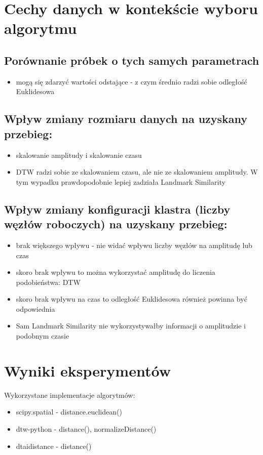 \section{Cechy danych w kontekście wyboru algorytmu}
\subsection{Porównanie próbek o tych samych parametrach}
\begin{itemize}
    \item mogą się zdarzyć wartości odstające - z czym średnio radzi sobie odległość Euklidesowa
\end{itemize}
\subsection{Wpływ zmiany rozmiaru danych na uzyskany przebieg:}\begin{itemize}
    \item skalowanie amplitudy i skalowanie czasu
    \item DTW radzi sobie ze skalowaniem czasu, ale nie ze skalowaniem amplitudy. W tym wypadku prawdopodobnie lepiej zadziała Landmark Similarity
\end{itemize}

\subsection{Wpływ zmiany konfiguracji klastra (liczby węzłów roboczych) na uzyskany przebieg:}
\begin{itemize}
    \item brak większego wpływu - nie widać wpływu liczby węzłów na amplitudę lub czas
    \item skoro brak wpływu to można wykorzystać amplitudę do liczenia podobieństwa: DTW
    \item skoro brak wpływu na czas to odległość Euklidesowa również powinna być odpowiednia
    \item Sam Landmark Similarity nie wykorzystywałby informacji o amplitudzie i podobnym czasie 
\end{itemize}

\section{Wyniki eksperymentów}
Wykorzystane implementacje algorytmów:
\begin{itemize}
    \item scipy.spatial - distance.euclidean()
    \item dtw-python - distance(), normalizeDistance()
    \item dtaidistance - distance()
\end{itemize}
